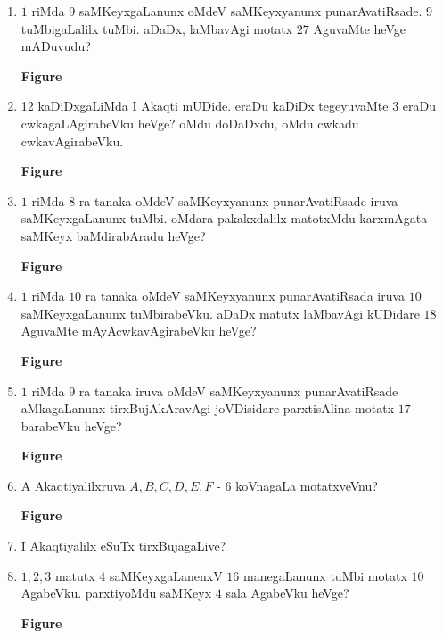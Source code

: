 \begin{enumerate}
\item $1$ riMda $9$ saMKeyxgaLanunx oMdeV saMKeyxyanunx punarAvatiRsade. $9$ tuMbigaLalilx tuMbi. aDaDx, laMbavAgi motatx $27$ AguvaMte heVge mADuvudu?
\begin{center}
{\rm\bfseries Figure}
\end{center}

\item 12 kaDiDxgaLiMda I Akaqti mUDide. eraDu kaDiDx tegeyuvaMte $3$ eraDu cwkagaLAgirabeVku heVge? oMdu doDaDxdu, oMdu cwkadu cwkavAgirabeVku.
\begin{center}
{\rm\bfseries Figure}
\end{center}

\item $1$ riMda $8$ ra tanaka oMdeV saMKeyxyanunx punarAvatiRsade iruva saMKeyxgaLanunx tuMbi. oMdara pakakxdalilx matotxMdu karxmAgata saMKeyx baMdirabAradu heVge?
\begin{center}
{\rm\bfseries Figure}
\end{center}

\item $1$ riMda $10$ ra tanaka oMdeV saMKeyxyanunx punarAvatiRsada iruva $10$ saMKeyxgaLanunx tuMbirabeVku. aDaDx matutx laMbavAgi kUDidare $18$ AguvaMte mAyAcwkavAgirabeVku heVge?
\begin{center}
{\rm\bfseries Figure}
\end{center}

\item $1$ riMda $9$ ra tanaka iruva oMdeV saMKeyxyanunx punarAvatiRsade aMkagaLanunx tirxBujAkAravAgi joVDisidare parxtisAlina motatx $17$ barabeVku heVge?
\begin{center}
{\rm\bfseries Figure}
\end{center}

\item A Akaqtiyalilxruva $A,B,C,D,E,F$ - $6$ koVnagaLa motatxveVnu?
\begin{center}
{\rm\bfseries Figure}
\end{center}

\item I Akaqtiyalilx eSuTx tirxBujagaLive?

\item $1,2,3$ matutx $4$ saMKeyxgaLanenxV $16$ manegaLanunx tuMbi motatx $10$ AgabeVku. parxtiyoMdu saMKeyx $4$ sala AgabeVku heVge?
\begin{center}
{\rm\bfseries Figure}
\end{center}


\end{enumerate}
